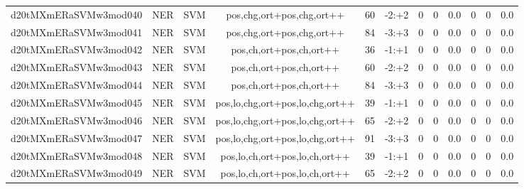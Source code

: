 \documentclass[a4paper]{article}
\begin{document}
\begin{landscape}
\begin{center}
\begin{tabular}{ |c|c|c|c|c|c|c|c|c|c|c|c|}
 
 	
 	\small{ d20tMXmERaSVMw3mod040 } & \small{ NER} & \small{  SVM }  & pos,chg,ort+pos,chg,ort++  &  60 &  \small{  -2:+2 }  &  0 & 0 & 0.0  &  0 & 0 & 0.0 \\
 	

 
 	
 	\small{ d20tMXmERaSVMw3mod041 } & \small{ NER} & \small{  SVM }  & pos,chg,ort+pos,chg,ort++  &  84 &  \small{  -3:+3 }  &  0 & 0 & 0.0  &  0 & 0 & 0.0 \\
 	

 
 	
 	\small{ d20tMXmERaSVMw3mod042 } & \small{ NER} & \small{  SVM }  & pos,ch,ort+pos,ch,ort++  &  36 &  \small{  -1:+1 }  &  0 & 0 & 0.0  &  0 & 0 & 0.0 \\
 	

 
 	
 	\small{ d20tMXmERaSVMw3mod043 } & \small{ NER} & \small{  SVM }  & pos,ch,ort+pos,ch,ort++  &  60 &  \small{  -2:+2 }  &  0 & 0 & 0.0  &  0 & 0 & 0.0 \\
 	

 
 	
 	\small{ d20tMXmERaSVMw3mod044 } & \small{ NER} & \small{  SVM }  & pos,ch,ort+pos,ch,ort++  &  84 &  \small{  -3:+3 }  &  0 & 0 & 0.0  &  0 & 0 & 0.0 \\
 	

 
 	
 	\small{ d20tMXmERaSVMw3mod045 } & \small{ NER} & \small{  SVM }  & pos,lo,chg,ort+pos,lo,chg,ort++  &  39 &  \small{  -1:+1 }  &  0 & 0 & 0.0  &  0 & 0 & 0.0 \\
 	

 
 	
 	\small{ d20tMXmERaSVMw3mod046 } & \small{ NER} & \small{  SVM }  & pos,lo,chg,ort+pos,lo,chg,ort++  &  65 &  \small{  -2:+2 }  &  0 & 0 & 0.0  &  0 & 0 & 0.0 \\
 	

 
 	
 	\small{ d20tMXmERaSVMw3mod047 } & \small{ NER} & \small{  SVM }  & pos,lo,chg,ort+pos,lo,chg,ort++  &  91 &  \small{  -3:+3 }  &  0 & 0 & 0.0  &  0 & 0 & 0.0 \\
 	

 
 	
 	\small{ d20tMXmERaSVMw3mod048 } & \small{ NER} & \small{  SVM }  & pos,lo,ch,ort+pos,lo,ch,ort++  &  39 &  \small{  -1:+1 }  &  0 & 0 & 0.0  &  0 & 0 & 0.0 \\
 	

 
 	
 	\small{ d20tMXmERaSVMw3mod049 } & \small{ NER} & \small{  SVM }  & pos,lo,ch,ort+pos,lo,ch,ort++  &  65 &  \small{  -2:+2 }  &  0 & 0 & 0.0  &  0 & 0 & 0.0 \\
 	


\end{tabular}
\end{center}
\end{landscape}
\end{document}
